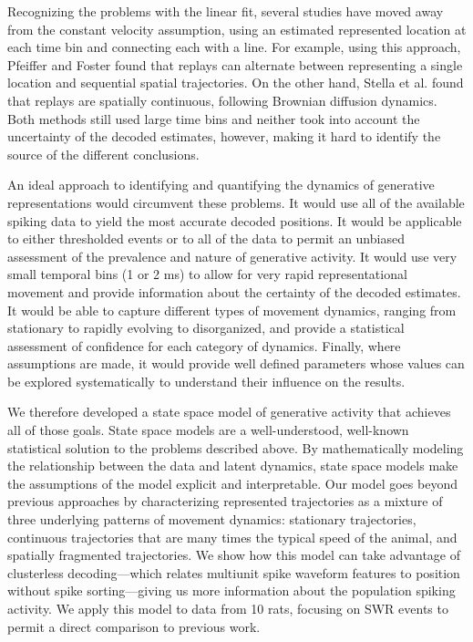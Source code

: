 \documentclass[times, twoside]{zHenriquesLab-StyleBioRxiv}
\begin{document}
Recognizing the problems with the linear fit, several studies have moved away from the constant velocity assumption, using an estimated represented location at each time bin and connecting each with a line. For example, using this approach, Pfeiffer and Foster \cite{PfeifferAutoassociativedynamicsgeneration2015} found that replays can alternate between representing a single location and sequential spatial trajectories. On the other hand, Stella et al. \cite{StellaHippocampalReactivationRandom2019} found that replays are spatially continuous, following Brownian diffusion dynamics. Both methods still used large time bins and neither took into account the uncertainty of the decoded estimates, however, making it hard to identify the source of the different conclusions.

An ideal approach to identifying and quantifying the dynamics of generative representations would circumvent these problems. It would use all of the available spiking data to yield the most accurate decoded positions. It would be applicable to either thresholded events or to all of the data to permit an unbiased assessment of the prevalence and nature of generative activity. It would use very small temporal bins (1 or 2 ms) to allow for very rapid representational movement and provide information about the certainty of the decoded estimates. It would be able to capture different types of movement dynamics, ranging from stationary to rapidly evolving to disorganized, and provide a statistical assessment of confidence for each category of dynamics. Finally, where assumptions are made, it would provide well defined parameters whose values can be explored systematically to understand their influence on the results.

We therefore developed a state space model of generative activity that achieves all of those goals. State space models are a well-understood, well-known statistical solution to the problems described above. By mathematically modeling the relationship between the data and latent dynamics, state space models make the assumptions of the model explicit and interpretable. Our model goes beyond previous approaches \cite{MaboudiUncoveringtemporalstructure2018, DengRapidclassificationhippocampal2016} by characterizing represented trajectories as a mixture of three underlying patterns of movement dynamics: stationary trajectories, continuous trajectories that are many times the typical speed of the animal, and spatially fragmented trajectories. We show how this model can take advantage of clusterless decoding---which relates multiunit spike waveform features to position without spike sorting---giving us more information about the population spiking activity. We apply this model to data from 10 rats, focusing on SWR events to permit a direct comparison to previous work. 
\end{document}

